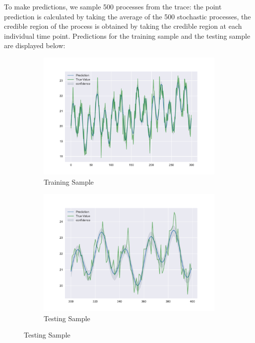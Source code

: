 \documentclass[letterpaper,12pt]{article}
\begin{document}
To make predictions, we sample 500 processes from the trace: the point prediction is calculated by taking the average of the 500 stochastic processes, the credible region of the process is obtained by taking the credible region at each individual time point. Predictions for the training sample and the testing sample are displayed below:
\begin{figure}[H]
	\centering
	\caption{Gaussian Process Prediction}
	\begin{subfigure}[h]{0.48\textwidth}
		\centering
		\includegraphics[width=\textwidth]{bayesian_prediction_training.pdf}
		\caption{Training Sample}
	\end{subfigure}
	\begin{subfigure}[h]{0.48\textwidth}
		\centering
		\includegraphics[width=\textwidth]{bayesian_prediction_testing.pdf}
		\caption{Testing Sample}
	\end{subfigure}
	\label{match_map}
\end{figure}
\end{document}
